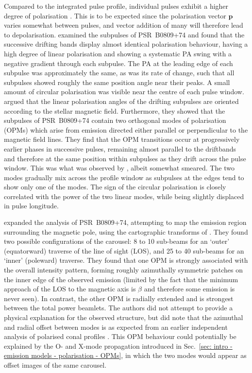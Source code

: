 Compared to the integrated pulse profile, individual pulses exhibit a higher degree of polarisation \citep[see][]{PulsarAstronomy}. This is to be expected since the polarisation vector $\mathbf{p}$ varies somewhat between pulses, and vector addition of many will therefore lead to depolarisation. \citet{THHM1971} examined the subpulses of PSR~B0809+74 and found that the successive drifting bands display almost identical polarisation behaviour, having a high degree of linear polarisation and showing a systematic PA swing with a negative gradient through each subpulse. The PA at the leading edge of each subpulse was approximately the same, as was its rate of change, such that all subpulses showed roughly the same position angle near their peaks. A small amount of circular polarisation was visible near the centre of each pulse window. \citet{RRS+2002} argued that the linear polarisation angles of the drifting subpulses are oriented according to the stellar magnetic field. Furthermore, they showed that the subpulses of PSR~B0809+74 contain two orthogonal modes of polarisation (OPMs) which arise from emission directed either parallel or perpendicular to the magnetic field lines. They find that the OPM transitions occur at progressively earlier phases in successive pulses, remaining almost parallel to the driftbands and therefore at the same position within subpulses as they drift across the pulse window. This was what was observed by \citet{THHM1971}, albeit somewhat smeared. The two modes gradually mix across the profile window as subpulses at the edges tend to show only one of the modes. The sign of the circular polarisation is closely correlated with the power of the two linear modes, while being slightly displaced in pulse longitude.

\citet{RRL+2006} expanded the analysis of PSR~B0809+74, attempting to map the emission region surrounding the magnetic pole, using the cartographic transforms of \citet[][see Appendix~\ref{app: geometry derivations}]{DRxx2001}. They found two possible configurations of the carousel: 8 to 10 sub-beams for an `outer' (equatorward) traverse of the line of sight (LOS), and 25 to 40 sub-beams for an `inner' (poleward) traverse. They found that one OPM is strongly associated with the overall intensity pattern, forming roughly azimuthally symmetric patches on the inner edge of the observed emission (limited by the fact that the minimum approach of the LOS to the magnetic axis is $\beta$ and therefore some emission is never seen). In contrast, the other OPM is radially extended and is strongest between the total power beamlets. The authors did not attempt to provide a physical explanation for the observed structure, but did note that the azimuthal and radial offset between modes is as expected from an earlier independent analysis of polarised conal profiles \citep{RRxx2003}. This OPM behaviour could potentially be explained by the O- and X-mode propagation introduced in Sec.~\ref{sec: intro - emission models - polarisation - OPMs}, in which the two modes would appear as offset images of the same carousel.



